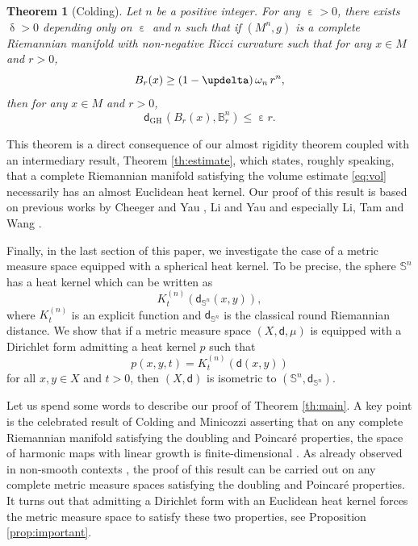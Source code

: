 \documentclass[10pt]{amsart}
\newcommand{\sGH}{{\scriptscriptstyle\mathrm{GH}\,}}
\newcommand{\NoChangel}[1]{%
\expandafter\let\csname old\string#1\endcsname=#1
\let#1=\relax
\newcommand{#1}{\mathcode`l="716C\csname old\string#1\endcsname\mathcode`l="7160 }%
}
\theoremstyle{plain}
\newtheorem{theorem}{Theorem}[section]
\theoremstyle{definition}
\newcommand{\setB}{\mathbb{B}}
\newcommand{\dist}{\mathsf{d}}
\DeclareMathOperator{\vol}{vol}\NoChangel{\vol}
\begin{document}
\begin{theorem}[Colding]\label{th:Colding} Let $n$ be a positive integer. For any $\upepsilon>0$, there exists $\updelta>0$ depending only on $\upepsilon$ and $n$ such that if
$(M^n,g)$ is a complete Riemannian manifold with non-negative Ricci curvature such that for any $x \in M$ and $r>0$,
\begin{equation}\label{eq:vol}\vol B_r(x) \ge \left(1-\updelta\right) \omega_n\, r^n,\end{equation}
then for
any $x\in M$ and $r>0$,
\[
\dist_{\sGH}\left(B_r(x), \setB^n_r\right)\le \upepsilon r.
\]
\end{theorem}

This theorem is a direct consequence of our almost rigidity theorem coupled with an intermediary result, Theorem \ref{th:estimate}, which states, roughly speaking, that a complete Riemannian manifold satisfying the volume estimate \eqref{eq:vol} necessarily has an almost Euclidean heat kernel. Our proof of this result is based on previous works by Cheeger and Yau \cite{CheegerYau}, Li and Yau \cite{LiYau} and especially Li, Tam and Wang \cite{LiTamWang}.

Finally, in the last section of this paper, we investigate the case of a metric measure space equipped with a spherical heat kernel. To be precise, the sphere $\mathbb{S}^n$ has a heat kernel which can be written as
\[
K_t^{(n)}(\dist_{\mathbb{S}^n}(x,y)),
\]
where $K_t^{(n)}$ is an explicit function and $\dist_{\mathbb{S}^n}$ is the classical round Riemannian distance. We show that if a metric measure space $(X,\dist,\mu)$ is equipped with a Dirichlet form admitting a heat kernel $p$ such that
\[
p(x,y,t)=K_t^{(n)}(\dist(x,y))
\]
for all $x, y \in X$ and $t>0$, then $(X,\dist)$ is isometric to $(\mathbb{S}^n,\dist_{\mathbb{S}^n})$.

Let us spend some words to describe our proof of Theorem \ref{th:main}. A key point is the celebrated result of Colding and Minicozzi asserting that on any complete Riemannian manifold satisfying the doubling and Poincaré properties, the space of harmonic maps with linear growth is finite-dimensional \cite{ColdingMinicozzi}. As already observed in non-smooth contexts \cite{Hua, HuaKellXia}, the proof of this result can be carried out on any complete metric measure spaces satisfying the doubling and Poincaré properties. It turns out that admitting a Dirichlet form with an Euclidean heat kernel forces the metric measure space to satisfy these two properties, see Proposition \ref{prop:important}.
\end{document}
